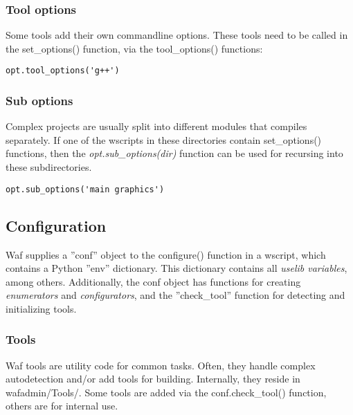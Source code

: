 \documentclass[a4paper,10pt]{article}
\begin{document}
\subsubsection{Tool options}
Some tools add their own commandline options. These tools need to be called in the set\_options() function, via the tool\_options() functions:

\begin{center}
	\begin{lstlisting}[caption=\footnotesize Adding command-line options of the tool 'g++']
	opt.tool_options('g++')
	\end{lstlisting}
\end{center}

\subsubsection{Sub options}
Complex projects are usually split into different modules that compiles separately. If one of the wscripts in these directories contain set\_options() functions, then the \emph{opt.sub\_options(dir)} function can be used for recursing into these subdirectories.

\begin{center}
	\begin{lstlisting}[caption=\footnotesize Calling the set\_options() functions of the wscripts in the directories 'main' and 'graphics']
	opt.sub_options('main graphics')
	\end{lstlisting}
\end{center}

\subsection{Configuration}
Waf supplies a ''conf'' object to the configure() function in a wscript, which contains a Python ''env'' dictionary. This dictionary contains all \emph{uselib variables}, among others. Additionally, the conf object has functions for creating  \emph{enumerators} and \emph{configurators}, and the ''check\_tool'' function for detecting and initializing tools.

\subsubsection{Tools}
Waf tools are utility code for common tasks. Often, they handle complex autodetection and/or add tools for building. Internally, they reside in wafadmin/Tools/. Some tools are added via the conf.check\_tool() function, others are for internal use.
\end{document}
